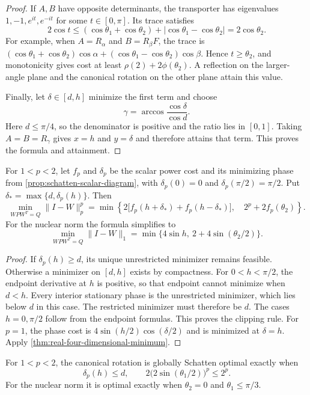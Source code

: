 \begin{proof}
If $A,B$ have opposite determinants, the transporter has eigenvalues
$1,-1,e^{it},e^{-it}$ for some $t\in[0,\pi]$. Its trace satisfies
\[
 2\cos t\leq
   (\cos\theta_1+\cos\theta_2)+|\cos\theta_1-\cos\theta_2|
 =2\cos\theta_2.
\]
For example, when $A=R_\alpha$ and $B=R_\beta F$, the trace is
$(\cos\theta_1+\cos\theta_2)\cos\alpha+
 (\cos\theta_1-\cos\theta_2)\cos\beta$.
Hence $t\geq\theta_2$, and monotonicity gives cost at least
$\rho(2)+2\phi(\theta_2)$. A reflection on the larger-angle plane
and the canonical rotation on the other plane attain this value.

Finally, let $\delta\in[d,h]$ minimize the first term and choose
\[
 \gamma=\arccos\frac{\cos\delta}{\cos d}.
\]
Here $d\leq\pi/4$, so the denominator is positive and the ratio lies
in $[0,1]$. Taking $A=B=R_\gamma$ gives $x=h$ and $y=\delta$ and
therefore attains that term. This proves the formula and attainment.
\end{proof}

\begin{corollary}
\label{cor:real-four-schatten}
For $1<p<2$, let $f_p$ and $\delta_p$ be the scalar power cost and its
minimizing phase from \cref{prop:schatten-scalar-diagram}, with
$\delta_p(0)=0$ and $\delta_p(\pi/2)=\pi/2$. Put
$\delta_* =\max\{d,\delta_p(h)\}$. Then
\[
 \min_{WPW^T=Q}\|I-W\|_p^p
 =\min\left\{
  2\bigl[f_p(h+\delta_*)+f_p(h-\delta_*)\bigr],\quad
  2^p+2f_p(\theta_2)\right\}.
\]
For the nuclear norm the formula simplifies to
\begin{equation}
 \min_{WPW^T=Q}\|I-W\|_1
   =\min\{4\sin h,\ 2+4\sin(\theta_2/2)\}.
 \label{eq:real-four-nuclear}
\end{equation}
\end{corollary}

\begin{proof}
If $\delta_p(h)\geq d$, its unique unrestricted minimizer remains feasible.
Otherwise a minimizer on $[d,h]$ exists by compactness. For $0<h<\pi/2$,
the endpoint derivative at $h$ is positive, so that endpoint cannot
minimize when $d<h$. Every interior stationary phase is the unrestricted
minimizer, which lies below $d$ in this case. The restricted minimizer
must therefore be $d$. The cases $h=0,\pi/2$ follow from the endpoint
formulas. This proves the clipping rule. For $p=1$, the phase cost is
$4\sin(h/2)\cos(\delta/2)$ and is minimized at $\delta=h$.
Apply \cref{thm:real-four-dimensional-minimum}.
\end{proof}

\begin{corollary}
\label{cor:real-four-canonical-schatten}
For $1<p<2$, the canonical rotation is globally Schatten optimal exactly when
\[
 \delta_p(h)\leq d,
 \qquad 2\bigl(2\sin(\theta_1/2)\bigr)^p\leq 2^p.
\]
For the nuclear norm it is optimal exactly when
$\theta_2=0$ and $\theta_1\leq\pi/3$.
\end{corollary}

